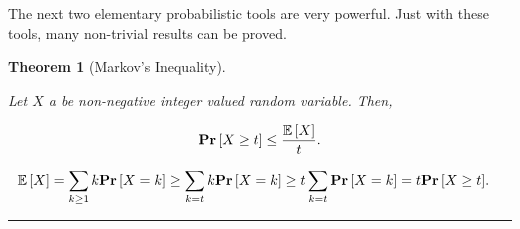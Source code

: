 \documentclass[twoside]{article}
\newcounter{lecnum}
\newtheorem{theorem}{Theorem}[lecnum]
\newenvironment{proof}{{\bf Proof:}}{\hfill\rule{2mm}{2mm}}
\newcommand{\hide}[1]{}
\newcommand{\Prob}[1]{{{\bf{Pr}}\left[{#1}\right]}}
\newcommand{\Mean}[1]{{\mathbb E}\left[{#1}\right]}
\begin{document}
\hide{ 
We will use the following inequalities to bound the binomial coefficient ${n \choose k}$. 

 \[
 \boxed{ \Big(\frac{n}{k}\Big)^k \leq {n \choose k} \leq \Big(\frac{en}{k}\Big)^k.}
 \]


We will also need to be able to upper- and lower-bound certain expressions.
Here are some useful inequalities. 

  \[
 \boxed{ (1-x)^n \geq 1-nx \text{,~~} \forall  0\leq x \leq 1.}
 \]
 
 \[
 \boxed{  e^x \geq x+1 \text{,~~}\forall x.}
 \]


  \[
 \boxed{  e^x \leq x^2+x+1\text{,~~~} \forall 0<|x|<1.}
 \]

 \[
 \boxed{  \log{(1+x)} = x-\frac{x^2}{2}+ \frac{x^3}{3} - \frac{x^4}{4} +  \ldots \text{,~~~}\forall 0<|x|<1.}
 \]


  \[
 \boxed{  \big( \sum_{i=1}^n a_i^2 \big)   \big( \sum_{i=1}^n b_i^2 \big) \geq  \big( \sum_{i=1}^n a_ib_i \big)^2.}
 \]

The above inequality is the Cauchy-Schwartz inequality, which is a special case of H\"older's inequality for $p=q=2$. 

\begin{theorem}[H\"older's inequality]
For any positive real numbers $p,q$ such that $\frac{1}{p}+\frac{1}{q}=1$ 

  \[
 \boxed{  \big( \sum_{i=1}^n |a_i b_i| \big)  \leq   \big( \sum_{i=1}^n |x_i|^p \big)^{1/p}    \big( \sum_{i=1}^n |x_i|^p \big)^{1/p}   .}
 \]
 
\end{theorem} 

}

The next two elementary probabilistic tools  are very powerful. Just with these tools, many non-trivial results
can be proved. 





\begin{theorem}[Markov's Inequality]
\label{thrm:lec1firstmoment} 

Let $X$ a be non-negative integer valued random variable. 
Then, 

$$ \Prob{X \geq t } \leq \frac{\Mean{X}}{t}.$$ 
\end{theorem} 

\begin{proof} 

\begin{align*} 
\Mean{X} &= \sum_{k\geq 1} k \Prob{X=k} \geq \sum_{k=t} k \Prob{X=k} \geq t \sum_{k=t} \Prob{X=k} = t\Prob{X \geq t}.
\end{align*} 

\end{proof}  
\end{document}
